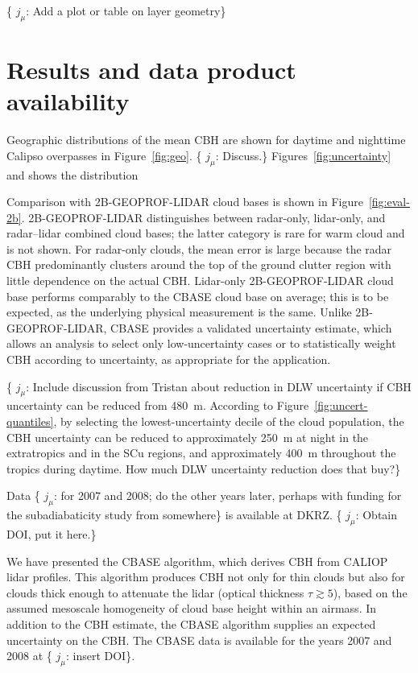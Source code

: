 \documentclass[essd,manuscript]{copernicus}\usepackage[]{graphicx}\usepackage[]{color}
\newcommand{\hlnum}[1]{\textcolor[rgb]{0.686,0.059,0.569}{#1}}%
\newcommand\comment[2]{\{\hlnum{ \textit{#1}: #2}\}}
\newcommand\commentjm[1]{\comment{$j_\mu$}{#1}}
\begin{document}
\commentjm{Add a plot or table on layer geometry}

\section{Results and data product availability}
\label{sec:results}

Geographic distributions of the mean CBH are shown for daytime and nighttime
Calipso overpasses in Figure~\ref{fig:geo}.  \commentjm{Discuss.}
Figures~\ref{fig:uncertainty} and  shows the distribution

Comparison with 2B-GEOPROF-LIDAR cloud bases is shown in
Figure~\ref{fig:eval-2b}.   2B-GEOPROF-LIDAR distinguishes between radar-only,
lidar-only, and radar--lidar combined cloud bases; the latter category is rare
for warm cloud and is not shown.  For radar-only clouds, the mean error is large
because the radar CBH predominantly clusters around the top of the
ground clutter region with little dependence on the actual CBH.
Lidar-only 2B-GEOPROF-LIDAR cloud base performs comparably to the CBASE cloud
base on average; this is to be expected, as the underlying physical measurement
is the same.   Unlike 2B-GEOPROF-LIDAR, CBASE provides a validated uncertainty
estimate, which allows an analysis to select only
low-uncertainty cases or to statistically weight CBH according to
uncertainty, as appropriate for the application.

\commentjm{Include discussion from Tristan about reduction in DLW uncertainty if
  CBH uncertainty can be reduced from 480~m.  According to
  Figure~\ref{fig:uncert-quantiles}, by selecting the lowest-uncertainty decile
  of the cloud population, the CBH uncertainty can be reduced to approximately
  250~m at night in the extratropics and in the SCu regions, and approximately
  400~m throughout the tropics during daytime.  How much DLW uncertainty
  reduction does that buy?}

Data \commentjm{for 2007 and 2008; do the other years later, perhaps with
  funding for the subadiabaticity study from somewhere} is available at DKRZ.
\commentjm{Obtain DOI, put it here.}

\conclusions
\label{sec:conclusions}

We have presented the CBASE algorithm, which derives CBH from CALIOP lidar
profiles.  This algorithm produces CBH not only for thin clouds but also for
clouds thick enough to attenuate the lidar (optical thickness $\tau \gtrsim 5$),
based on the assumed mesoscale homogeneity of cloud base height within an
airmass.  In addition to the CBH estimate, the CBASE algorithm supplies an
expected uncertainty on the CBH.  The CBASE data is available for the years 2007
and 2008 at \commentjm{insert DOI}.
\end{document}

